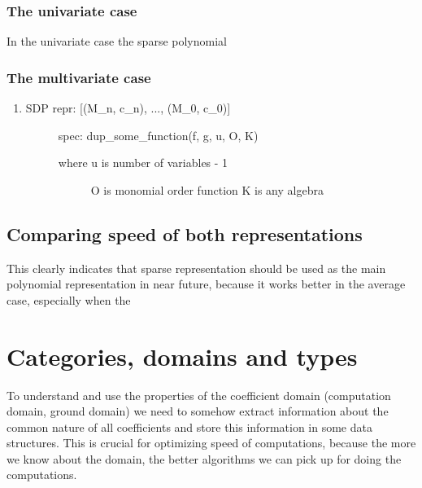 \subsubsection{The univariate case}

In the univariate case the sparse polynomial


\subsubsection{The multivariate case}
\begin{enumerate}
\item {} \begin{description}
\item[SDP repr: {[}(M\_n, c\_n), ..., (M\_0, c\_0){]}] \leavevmode
spec: dup\_some\_function(f, g, u, O, K)
\begin{description}
\item[where u is number of variables - 1] \leavevmode
O is monomial order function
K is any algebra

\end{description}

\end{description}

\end{enumerate}


\subsection{Comparing speed of both representations}

This clearly indicates that sparse representation should be used as the main polynomial
representation in near future, because it works better in the average case, especially
when the


\section{Categories, domains and types}

To understand and use the properties of the coefficient domain (computation domain, ground domain)
we need to somehow extract information about the common nature of all coefficients and store this
information in some data structures. This is crucial for optimizing speed of computations, because
the more we know about the domain, the better algorithms we can pick up for doing the computations.

\cite{Bronstein2004algebra}
\cite{Aldor2000guide}

